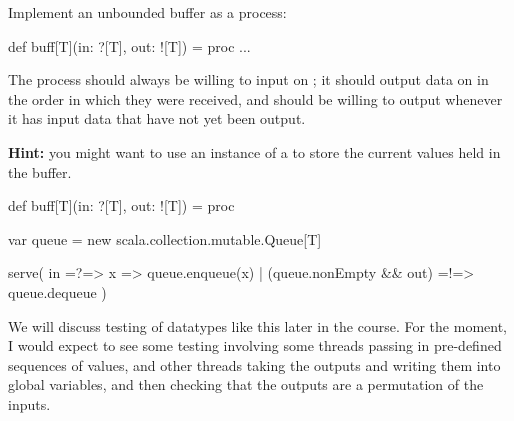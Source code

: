 \begin{question}
Implement an unbounded buffer as a process:
%
\begin{scala}
def buff[T](in: ?[T], out: ![T]) = proc{ ... }
\end{scala}
%
The process should always be willing to input on ; it should output
data on  in the order in which they were received, and should be
willing to output whenever it has input data that have not yet been output. 

{\bf Hint:} you might want to use an instance of a
 to store the current values held in the
buffer.
\end{question}


\begin{answer}
\Small
\begin{scala}
  def buff[T](in: ?[T], out: ![T]) = proc{
    var queue = new scala.collection.mutable.Queue[T]

    serve(
      in =?=> { x => queue.enqueue(x) }
      | (queue.nonEmpty && out) =!=> { queue.dequeue }
    )
  }
\end{scala}
%
We will discuss testing of datatypes like this later in the course.  For the
moment, I would expect to see some testing involving some threads passing in
pre-defined sequences of values, and other threads taking the outputs and
writing them into global variables, and then checking that the outputs are a
permutation of the inputs. 
%
\end{answer}






